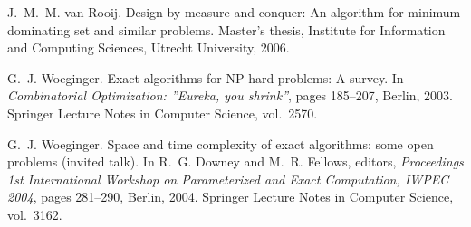 \documentclass[fleqn]{stacs_proc}
\begin{document}
\begin{thebibliography}{10}
J.~M.~M. {van Rooij}.
\newblock Design by measure and conquer: An {} algorithm for
  minimum dominating set and similar problems.
\newblock Master's thesis, Institute for Information and Computing Sciences,
  Utrecht University, 2006.

G.~J. Woeginger.
\newblock Exact algorithms for {NP}-hard problems: {A} survey.
\newblock In {\em Combinatorial Optimization: ''Eureka, you shrink''}, pages
  185--207, Berlin, 2003. Springer Lecture Notes in Computer Science,
  vol.~2570.

G.~J. Woeginger.
\newblock Space and time complexity of exact algorithms: some open problems
  (invited talk).
\newblock In R.~G. Downey and M.~R. Fellows, editors, {\em Proceedings 1st
  International Workshop on Parameterized and Exact Computation, IWPEC 2004},
  pages 281--290, Berlin, 2004. Springer Lecture Notes in Computer Science,
  vol.~3162.

\end{thebibliography}

\newpage
\null
\end{document}
